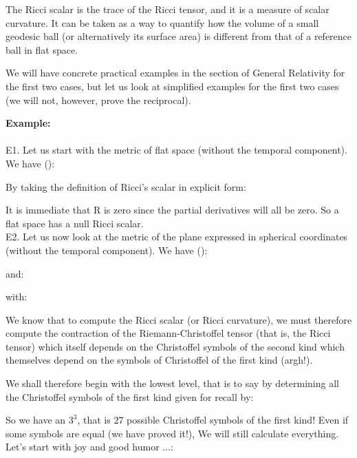 	The Ricci scalar is the trace of the Ricci tensor, and it is a measure of scalar curvature. It can be taken as a way to quantify how the volume of a small geodesic ball (or alternatively its surface area) is different from that of a reference ball in flat space.

	We will have concrete practical examples in the section of General Relativity for the first two cases, but let us look at simplified examples for the first two cases (we will not, however, prove the reciprocal).
	
	\begin{tcolorbox}[colframe=black,colback=white,sharp corners]
	\textbf{{\Large {}}Example:}\\\\
	E1. Let us start with the metric of flat space (without the temporal component). We have ():
	
	By taking the definition of Ricci's scalar in explicit form:
	
	It is immediate that R is zero since the partial derivatives will all be zero. So a flat space has a null Ricci scalar.\\
	
	E2. Let us now look at the metric of the plane expressed in spherical coordinates (without the temporal component). We have ():
	
	and:
	
	with:
	
	We know that to compute the Ricci scalar (or Ricci curvature), we must therefore compute the contraction of the Riemann-Christoffel tensor (that is, the Ricci tensor) which itself depends on the Christoffel symbols of the second kind which themselves depend on the symbols of Christoffel of the first kind (argh!).

	We shall therefore begin with the lowest level, that is to say by determining all the Christoffel symbols of the first kind given for recall by:
	
	
	\end{tcolorbox}
	\begin{tcolorbox}[colframe=black,colback=white,sharp corners]
	So we have an $3^3$, that is $27$ possible Christoffel symbols of the first kind! Even if some symbols are equal (we have proved it!), We will still calculate everything.\\

	Let's start with joy and good humor ...:
	
	\end{tcolorbox}
	
